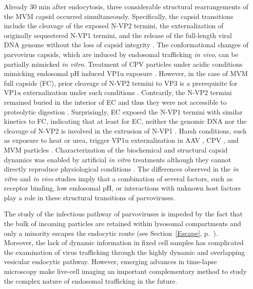 Already 30 min after endocytosis, three considerable structural rearrangements of the MVM capsid occurred simultaneously. Specifically, the capsid transitions include the cleavage of the exposed N-VP2 termini, the externalization of originally sequestered N-VP1 termini, and the release of the full-length viral DNA genome without the loss of capsid integrity \cite{pmid16379002}. The conformational changes of parvovirus capsids, which are induced by endosomal trafficking \textit{in vivo}, can be partially mimicked \textit{in vitro}. Treatment of CPV particles under acidic conditions mimicking endosomal pH induced VP1u exposure \cite{pmid14644609}. However, in the case of MVM full capsids (FC), prior cleavage of N-VP2 termini to VP3 is a prerequisite for VP1u externalization under such conditions \cite{pmid9927584, pmid16352540}. Contrarily, the N-VP2 termini remained buried in the interior of EC and thus they were not accessible to proteolytic digestion \cite{pmid16379002}. Surprisingly, EC exposed the N-VP1 termini with similar kinetics to FC, indicating that at least for EC, neither the genomic DNA nor the cleavage of N-VP2 is involved in the extrusion of N-VP1 \cite{pmid9927584, pmid16379002}. Harsh conditions, such as exposure to heat or urea, trigger VP1u externalization in AAV \cite{pmid15827144}, CPV \cite{pmid11799183, pmid9770425}, and MVM particles \cite{pmid9927584, pmid19955311}. Characterization of the biochemical and structural capsid dynamics was enabled by artificial \textit{in vitro} treatments although they cannot directly reproduce physiological conditions \cite{pmid9927584, pmid19955311, pmid15827144, pmid11799183}. The differences observed in the \textit{in vitro} and \textit{in vivo} studies imply that a combination of several factors, such as receptor binding, low endosomal pH, or interactions with unknown host factors play a role in these structural transitions of parvoviruses.       

The study of the infectious pathway of parvoviruses is impeded by the fact that the bulk of incoming particles are retained within lysosomal compartments and only a minority escapes the endocytic route (see Section~\ref{Escape}, p.~\pageref{Escape}). Moreover, the lack of dynamic information in fixed cell samples has complicated the examination of virus trafficking through the highly dynamic and overlapping vesicular endocytic pathway. However, emerging advances in time-lapse microscopy make live-cell imaging an important complementary method to study the complex nature of endosomal trafficking in the future.

